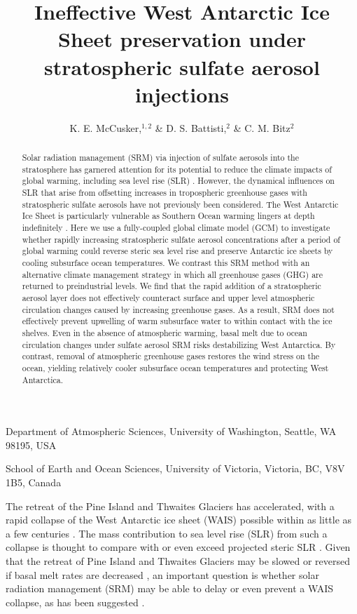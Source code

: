 \documentclass{nature}
\title{Ineffective West Antarctic Ice Sheet preservation under stratospheric sulfate aerosol injections}
\author{K. E. McCusker,$^{1,2}$ \& D. S. Battisti,$^{2}$ \& C. M. Bitz$^2$}
\begin{document}
\maketitle

\begin{affiliations}
 \item Department of Atmospheric Sciences, University of Washington, Seattle, WA 98195, USA
 \item School of Earth and Ocean Sciences, University of Victoria, Victoria, BC, V8V 1B5, Canada
\end{affiliations}


\begin{abstract}

Solar radiation management (SRM) via injection of sulfate aerosols into the stratosphere has garnered attention for its potential to reduce the climate impacts of global warming, including sea level rise (SLR) \cite{moore10,irvine12}. However, the dynamical influences on SLR that arise from offsetting increases in tropospheric greenhouse gases with stratospheric sulfate aerosols \cite{ammann10} have not previously been considered. The West Antarctic Ice Sheet is particularly vulnerable as Southern Ocean warming lingers at depth indefinitely \cite{gillett11}. Here we use a fully-coupled global climate model (GCM) to investigate whether rapidly increasing stratospheric sulfate aerosol concentrations after a period of global warming could reverse steric sea level rise and preserve Antarctic ice sheets by cooling subsurface ocean temperatures. We contrast this SRM method with an alternative climate management strategy in which all greenhouse gases (GHG) are returned to preindustrial levels. We find that the rapid addition of a stratospheric aerosol layer does not effectively counteract surface and upper level atmospheric circulation changes caused by increasing greenhouse gases. As a result, SRM does not effectively prevent upwelling of warm subsurface water to within contact with the ice shelves. Even in the absence of atmospheric warming, basal melt due to ocean circulation changes under sulfate aerosol SRM risks destabilizing West Antarctica. By contrast, removal of atmospheric greenhouse gases restores the wind stress on the ocean, yielding relatively cooler subsurface ocean temperatures and protecting West Antarctica. 

\end{abstract}

The retreat of the Pine Island and Thwaites Glaciers has accelerated, with a rapid collapse of the West Antarctic ice sheet (WAIS) possible within as little as a few centuries \cite{joughin14,rignot14,favier14}. The mass contribution to sea level rise (SLR) from such a collapse is thought to compare with or even exceed projected steric SLR \cite{church13}. Given that the retreat of Pine Island and Thwaites Glaciers may be slowed or reversed if basal melt rates are decreased \cite{favier14}, an important question is whether solar radiation management (SRM) may be able to delay or even prevent a WAIS collapse, as has been suggested \cite{blackstock09}.
\end{document}

